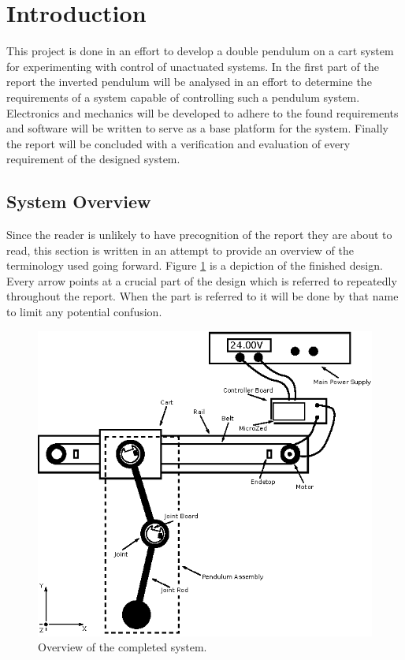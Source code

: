 \section{Introduction}
This project is done in an effort to develop a double pendulum on a cart system for experimenting with control of unactuated systems.
In the first part of the report the inverted pendulum will be analysed in an effort to determine the requirements of a system capable of controlling such a pendulum system.
Electronics and mechanics will be developed to adhere to the found requirements and software will be written to serve as a base platform for the system.
Finally the report will be concluded with a verification and evaluation of every requirement of the designed system.

\subsection{System Overview} %
\label{sub:system_overview}
Since the reader is unlikely to have precognition of the report they are about to read, this section is written in an attempt to provide an overview of the terminology used going forward.
Figure \ref{fig:systemoverview} is a depiction of the finished design.
Every arrow points at a crucial part of the design which is referred to repeatedly throughout the report.
When the part is referred to it will be done by that name to limit any potential confusion.
\begin{figure}[h]
	\centering
	\includegraphics[width=\linewidth]{graphics/system_overview}
	\caption{Overview of the completed system.}
	\label{fig:systemoverview}
\end{figure}

